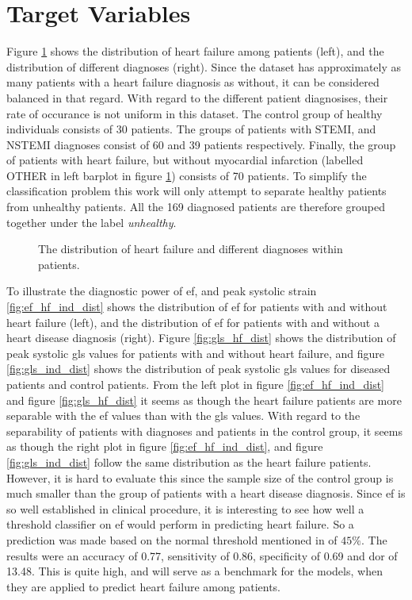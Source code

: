 \section{Target Variables} \label{sec:target}
Figure \ref{fig:hf_ind_dist} shows the distribution of heart failure among patients (left), and the distribution of different diagnoses (right). Since the dataset has approximately as many patients with a heart failure diagnosis as without, it can be considered balanced in that regard. With regard to the different patient diagnosises, their rate of occurance is not uniform in this dataset. The control group of healthy individuals consists of 30 patients. The groups of patients with STEMI, and NSTEMI diagnoses consist of 60 and 39 patients respectively. Finally, the group of patients with heart failure, but without myocardial infarction (labelled OTHER in left barplot in figure \ref{fig:hf_ind_dist}) consists of 70 patients. To simplify the classification problem this work will only attempt to separate healthy patients from unhealthy patients. All the 169 diagnosed patients are therefore grouped together under the label \textit{unhealthy}. \bigskip

\begin{figure}[h]
    \centering
    
    \caption{The distribution of heart failure and different diagnoses within patients.}
    \label{fig:hf_ind_dist}
\end{figure}

To illustrate the diagnostic power of \acrshort{ef}, and peak systolic strain \ref{fig:ef_hf_ind_dist} shows the distribution of \acrshort{ef} for patients with and without heart failure (left), and the distribution of \acrshort{ef} for patients with and without a heart disease diagnosis (right). Figure \ref{fig:gls_hf_dist} shows the distribution of peak systolic \acrshort{gls} values for patients with and without heart failure, and figure \ref{fig:gls_ind_dist} shows the distribution of peak systolic \acrshort{gls} values for diseased patients and control patients. From the left plot in figure \ref{fig:ef_hf_ind_dist} and figure \ref{fig:gls_hf_dist} it seems as though the heart failure patients are more separable with the \acrshort{ef} values than with the \acrshort{gls} values. With regard to the separability of patients with diagnoses and patients in the control group, it seems as though the right plot in figure \ref{fig:ef_hf_ind_dist}, and figure \ref{fig:gls_ind_dist} follow the same distribution as the heart failure patients. However, it is hard to evaluate this since the sample size of the control group is much smaller than the group of patients with a heart disease diagnosis. Since \acrshort{ef} is so well established in clinical procedure, it is interesting to see how well a threshold classifier on \acrshort{ef} would perform in predicting heart failure. So a prediction was made based on the normal threshold mentioned in \textcite{myocardial_imaging} of $45\%$. The results were an accuracy of 0.77, sensitivity of 0.86, specificity of 0.69 and \acrshort{dor} of 13.48. This is quite high, and will serve as a benchmark for the models, when they are applied to predict heart failure among patients.  
\bigskip

